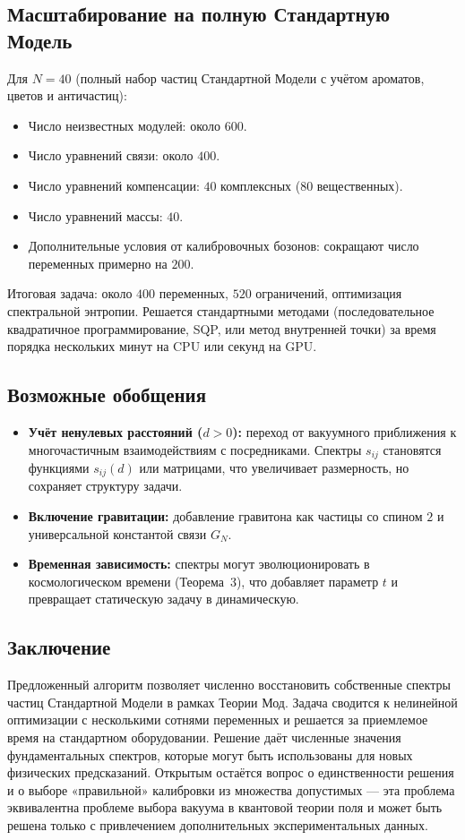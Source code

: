 \documentclass[12pt,a4paper]{article}
\begin{document}
\subsection{Масштабирование на полную Стандартную Модель}
Для $N = 40$ (полный набор частиц Стандартной Модели с учётом ароматов, цветов и античастиц):

\begin{itemize}
    \item Число неизвестных модулей: около $600$.
    \item Число уравнений связи: около $400$.
    \item Число уравнений компенсации: $40$ комплексных ($80$ вещественных).
    \item Число уравнений массы: $40$.
    \item Дополнительные условия от калибровочных бозонов: сокращают число переменных примерно на $200$.
\end{itemize}

Итоговая задача: около $400$ переменных, $520$ ограничений, оптимизация спектральной энтропии. Решается стандартными методами (последовательное квадратичное программирование, SQP, или метод внутренней точки) за время порядка нескольких минут на CPU или секунд на GPU.

\subsection{Возможные обобщения}
\begin{itemize}
    \item \textbf{Учёт ненулевых расстояний ($d > 0$):} переход от вакуумного приближения к многочастичным взаимодействиям с посредниками. Спектры $s_{ij}$ становятся функциями $s_{ij}(d)$ или матрицами, что увеличивает размерность, но сохраняет структуру задачи.
    \item \textbf{Включение гравитации:} добавление гравитона как частицы со спином $2$ и универсальной константой связи $G_N$.
    \item \textbf{Временная зависимость:} спектры могут эволюционировать в космологическом времени (Теорема~3), что добавляет параметр $t$ и превращает статическую задачу в динамическую.
\end{itemize}

\subsection{Заключение}
Предложенный алгоритм позволяет численно восстановить собственные спектры частиц Стандартной Модели в рамках Теории Мод. Задача сводится к нелинейной оптимизации с несколькими сотнями переменных и решается за приемлемое время на стандартном оборудовании. Решение даёт численные значения фундаментальных спектров, которые могут быть использованы для новых физических предсказаний. Открытым остаётся вопрос о единственности решения и о выборе «правильной» калибровки из множества допустимых --- эта проблема эквивалентна проблеме выбора вакуума в квантовой теории поля и может быть решена только с привлечением дополнительных экспериментальных данных.
\end{document}
